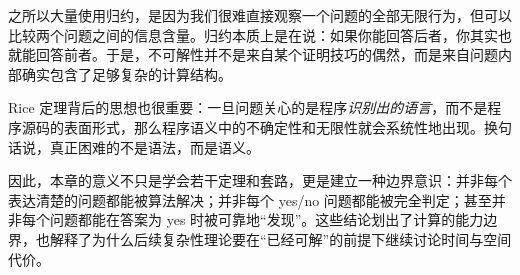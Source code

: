 之所以大量使用归约，是因为我们很难直接观察一个问题的全部无限行为，但可以比较两个问题之间的信息含量。归约本质上是在说：如果你能回答后者，你其实也就能回答前者。于是，不可解性并不是来自某个证明技巧的偶然，而是来自问题内部确实包含了足够复杂的计算结构。

Rice 定理背后的思想也很重要：一旦问题关心的是程序\emph{识别出的语言}，而不是程序源码的表面形式，那么程序语义中的不确定性和无限性就会系统性地出现。换句话说，真正困难的不是语法，而是语义。

因此，本章的意义不只是学会若干定理和套路，更是建立一种边界意识：并非每个表达清楚的问题都能被算法解决；并非每个 yes/no 问题都能被完全判定；甚至并非每个问题都能在答案为 yes 时被可靠地“发现”。这些结论划出了计算的能力边界，也解释了为什么后续复杂性理论要在“已经可解”的前提下继续讨论时间与空间代价。

\clearpage
